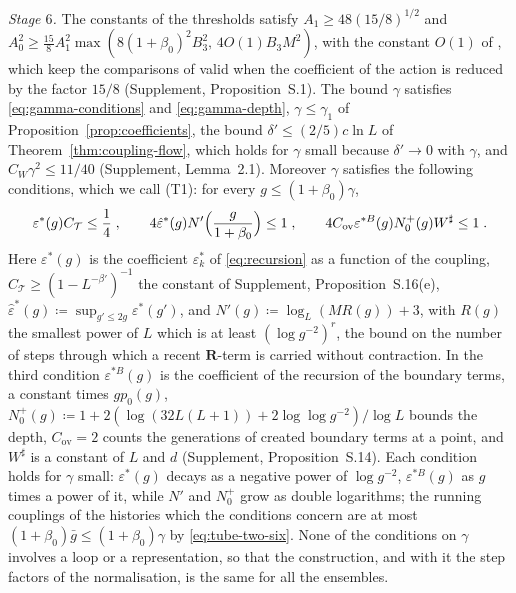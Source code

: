 \documentclass[11pt]{preprint}
\numberwithin{equation}{section}
\theoremstyle{definition}
\theoremstyle{remark}
\theoremstyle{plain}
\begin{document}
\emph{Stage $6$.} The constants of the thresholds satisfy $A_1 \geq 48(15/8)^{1/2}$ and $A_0^2 \geq \frac{15}{8}A_1^2\max(8(1 + \beta_0)^2B_3^2,\, 4O(1)B_3M^2)$, with the constant $O(1)$ of \cite[p.~381]{BalabanLFR2}, which keep the comparisons of \cite[pp.~381--382]{BalabanLFR2} valid when the coefficient of the action is reduced by the factor $15/8$ (Supplement, Proposition~S.1). The bound $\gamma$ satisfies \eqref{eq:gamma-conditions} and \eqref{eq:gamma-depth}, $\gamma \leq \gamma_1$ of Proposition~\ref{prop:coefficients}, the bound $\delta' \leq (2/5)c\ln L$ of Theorem~\ref{thm:coupling-flow}, which holds for $\gamma$ small because $\delta' \to 0$ with $\gamma$, and $C_W\gamma^2 \leq 11/40$ (Supplement, Lemma~2.1). Moreover $\gamma$ satisfies the following conditions, which we call (T1): for every $g \leq (1 + \beta_0)\gamma$,
\begin{equation}\label{eq:t-one}
    \varepsilon^*(g)C_{\mathcal T} \leq \frac14\;,
    \qquad
    4\hat\varepsilon^*(g)N'\Bigl(\frac{g}{1 + \beta_0}\Bigr) \leq 1\;,
    \qquad
    4C_{\mathrm{ov}}\varepsilon^{*B}(g)N_0^+(g)W^\sharp \leq 1\;.
\end{equation}
Here $\varepsilon^*(g)$ is the coefficient $\varepsilon^*_k$ of \eqref{eq:recursion} as a function of the coupling, $C_{\mathcal T} \geq (1 - L^{-\beta'})^{-1}$ the constant of Supplement, Proposition~S.16(e), $\hat\varepsilon^*(g) \coloneqq \sup_{g' \leq 2g}\varepsilon^*(g')$, and $N'(g) \coloneqq \log_L(MR(g)) + 3$, with $R(g)$ the smallest power of $L$ which is at least $(\log g^{-2})^r$, the bound on the number of steps through which a recent $\mathbf R$-term is carried without contraction. In the third condition $\varepsilon^{*B}(g)$ is the coefficient of the recursion of the boundary terms, a constant times $gp_0(g)$, $N_0^+(g) \coloneqq 1 + 2(\log(32L(L + 1)) + 2\log\log g^{-2})/\log L$ bounds the depth, $C_{\mathrm{ov}} = 2$ counts the generations of created boundary terms at a point, and $W^\sharp$ is a constant of $L$ and $d$ (Supplement, Proposition~S.14). Each condition holds for $\gamma$ small: $\varepsilon^*(g)$ decays as a negative power of $\log g^{-2}$, $\varepsilon^{*B}(g)$ as $g$ times a power of it, while $N'$ and $N_0^+$ grow as double logarithms; the running couplings of the histories which the conditions concern are at most $(1 + \beta_0)\bar g \leq (1 + \beta_0)\gamma$ by \eqref{eq:tube-two-six}. None of the conditions on $\gamma$ involves a loop or a representation, so that the construction, and with it the step factors of the normalisation, is the same for all the ensembles.
\end{document}
